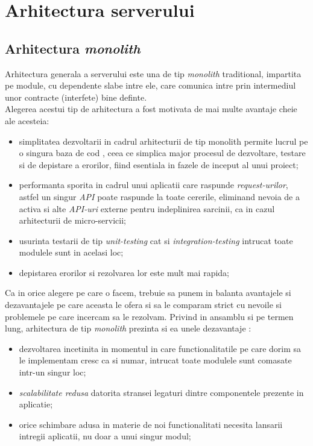\section{Arhitectura serverului}

\subsection*{Arhitectura \textit{monolith}}

Arhitectura generala a serverului este una de tip \textit{monolith} traditional, impartita pe module, cu dependente slabe intre ele, care comunica intre prin intermediul unor contracte (interfete) bine definte.\\
Alegerea acestui tip de arhitectura a fost motivata de mai multe avantaje cheie ale acesteia: 
\begin{itemize}
	\item simplitatea dezvoltarii in cadrul arhitecturii de tip monolith permite lucrul pe o singura baza de cod , ceea ce simplica major procesul de dezvoltare, testare si de depistare a erorilor, fiind esentiala in fazele de inceput al unui proiect;
	
	\item  performanta sporita in cadrul unui aplicatii care raspunde \textit{request-urilor}, astfel un singur \textit{API} poate raspunde la toate cererile, eliminand nevoia de a activa si alte \textit{API-uri} externe pentru indeplinirea sarcinii, ca in cazul arhitecturii de micro-servicii;
	
	\item usurinta testarii de tip \textit{unit-testing} cat si \textit{integration-testing} intrucat toate modulele sunt in acelasi loc;
	
	\item  depistarea erorilor si rezolvarea lor este mult mai rapida;
\end{itemize}
Ca in orice alegere pe care o facem, trebuie sa punem in balanta avantajele si dezavantajele pe care aceasta le ofera si sa le comparam strict cu nevoile si problemele pe care incercam sa le rezolvam. Privind in ansamblu si pe termen lung, arhitectura de tip \textit{monolith} prezinta si ea unele dezavantaje : 

\begin{itemize}

 \item dezvoltarea incetinita in momentul in care functionalitatile pe care dorim sa le implementam cresc ca si numar, intrucat toate modulele sunt comasate intr-un singur loc;
 
 \item \textit{scalabilitate redusa} datorita stransei legaturi dintre componentele prezente in aplicatie;
 
 \item 	orice schimbare adusa in materie de noi functionalitati necesita lansarii intregii aplicatii, nu doar a unui singur modul;

\end{itemize}

